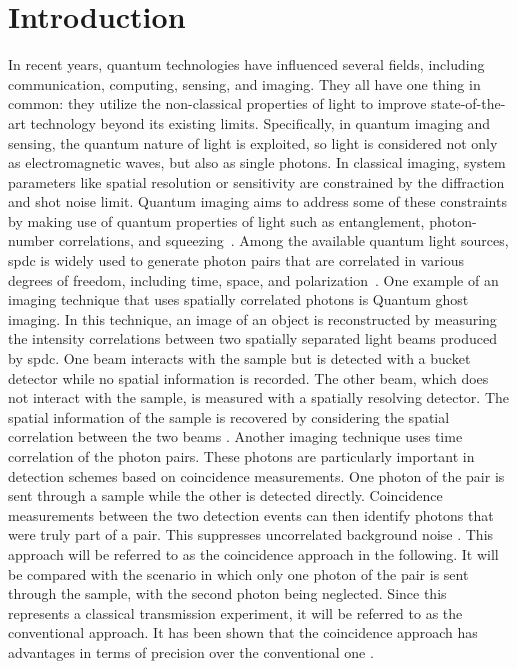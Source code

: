 \section{Introduction}

In recent years, quantum technologies have influenced several fields, including communication, computing, sensing, and imaging. They all have one thing in common: they utilize the non-classical properties of light to improve state-of-the-art technology beyond its existing limits. \newline
Specifically, in quantum imaging and sensing, the quantum nature of light is exploited, so light is considered not only as electromagnetic waves, but also as single photons. \newline
In classical imaging, system parameters like spatial resolution or sensitivity are constrained by the diffraction and shot noise limit. 
Quantum imaging aims to address some of these constraints by making use of quantum properties of light such as entanglement, photon-number correlations, and squeezing~\cite{defienneAdvancesQuantumImaging2024,moreauImagingQuantumStates2019}. \newline
Among the available quantum light sources, \acrfull{spdc} is widely used to generate photon pairs that are correlated in various degrees of freedom, including time, space, and polarization~\cite{moreauImagingQuantumStates2019}. \newline
One example of an imaging technique that uses spatially correlated photons is Quantum ghost imaging. In this technique, an image of an object is reconstructed by measuring the intensity correlations between two spatially separated light beams produced by \acrshort{spdc}. One beam interacts with the sample but is detected with a bucket detector while no spatial information is recorded. The other beam, which does not interact with the sample, is measured with a spatially resolving detector. The spatial information of the sample is recovered by considering the spatial correlation between the two beams \cite{gilabertebassetPerspectivesApplicationsQuantum2019,lemosQuantumImagingUndetected2014}. \newline
Another imaging technique uses time correlation of the photon pairs.
These photons are particularly important in detection schemes based on coincidence measurements. One photon of the pair is sent through a sample while the other is detected directly. Coincidence measurements between the two detection events can then identify photons that were truly part of a pair. This suppresses uncorrelated background noise \cite{moreauImagingQuantumStates2019}. This approach will be referred to as the coincidence approach in the following. It will be compared with the scenario in which only one photon of the pair is sent through the sample, with the second photon being neglected. Since this represents a classical transmission experiment, it will be referred to as the conventional approach. It has been shown that the coincidence approach has advantages in terms of precision over the conventional one \cite{sabines-chesterkingSubShotNoiseTransmissionMeasurement2017,sabines-chesterkingTwinbeamSubshotnoiseRasterscanning2019}. \newline
